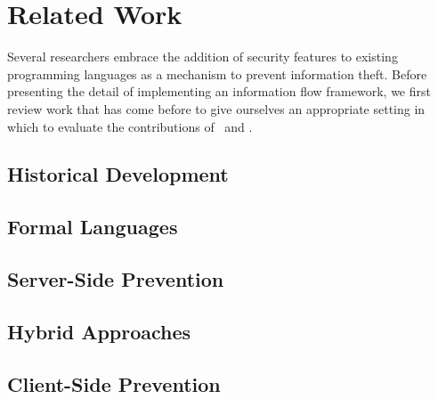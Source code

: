 
\chapter{Related Work}

Several researchers embrace the addition of security features to existing programming languages as a mechanism to prevent information theft.
Before presenting the detail of implementing an information flow framework, we first review work that has come before to give ourselves an appropriate setting in which to evaluate the contributions of \FlowCore\ and \JitFlow.

\section{Historical Development}

\section{Formal Languages}
\section{Server-Side Prevention}
\section{Hybrid Approaches}
\section{Client-Side Prevention}


